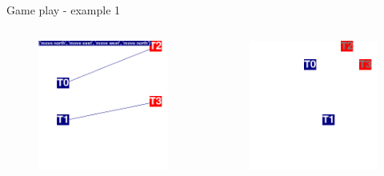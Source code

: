 \documentclass{beamer}
\begin{document}
\begin{frame}{Game play - example 1}
\begin{columns}
\begin{figure}[htp]
  \centering
  \includegraphics[width=\textwidth]{images/animation03/screenshot03.png}
\end{figure}
\begin{figure}[htp]
  \centering
  \includegraphics[width=\textwidth]{images/animation03/screenshot99.png}
\end{figure}

\end{columns}
\end{frame}
\end{document}
